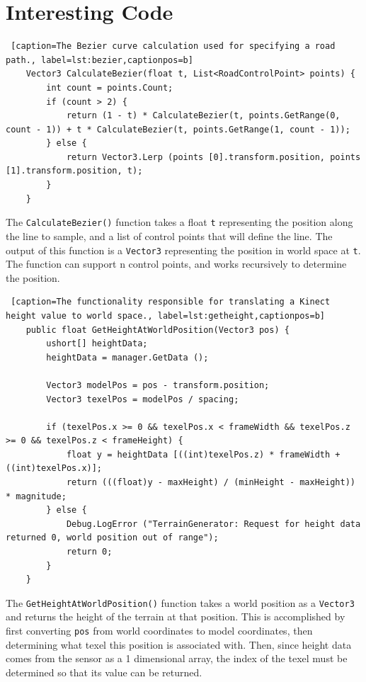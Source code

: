 \documentclass[onecolumn, draftclsnofoot,10pt, compsoc]{IEEEtran}
\begin{document}
\section{Interesting Code}

\begin{lstlisting} [caption=The Bezier curve calculation used for specifying a road path., label=lst:bezier,captionpos=b]
	Vector3 CalculateBezier(float t, List<RoadControlPoint> points) {
		int count = points.Count;
		if (count > 2) {
			return (1 - t) * CalculateBezier(t, points.GetRange(0, count - 1)) + t * CalculateBezier(t, points.GetRange(1, count - 1));
		} else {
			return Vector3.Lerp (points [0].transform.position, points [1].transform.position, t);
		}
	}
\end{lstlisting}

The \texttt{CalculateBezier()} function takes a float \texttt{t} representing the position along the line to sample, and a list of control points that will define the line. The output of this function is a \texttt{Vector3} representing the position in world space at \texttt{t}. The function can support n control points, and works recursively to determine the position.
\\
\begin{lstlisting} [caption=The functionality responsible for translating a Kinect height value to world space., label=lst:getheight,captionpos=b]
	public float GetHeightAtWorldPosition(Vector3 pos) {
		ushort[] heightData;
		heightData = manager.GetData ();

		Vector3 modelPos = pos - transform.position;
		Vector3 texelPos = modelPos / spacing;

		if (texelPos.x >= 0 && texelPos.x < frameWidth && texelPos.z >= 0 && texelPos.z < frameHeight) {
			float y = heightData [((int)texelPos.z) * frameWidth + ((int)texelPos.x)];
			return (((float)y - maxHeight) / (minHeight - maxHeight)) * magnitude;
		} else {
			Debug.LogError ("TerrainGenerator: Request for height data returned 0, world position out of range");
			return 0;
		}
	}
\end{lstlisting}

The \texttt{GetHeightAtWorldPosition()} function takes a world position as a \texttt{Vector3} and returns the height of the terrain at that position. This is accomplished by first converting \texttt{pos} from world coordinates to model coordinates, then determining what texel this position is associated with. Then, since height data comes from the sensor as a 1 dimensional array, the index of the texel must be determined so that its value can be returned.
\end{document}
